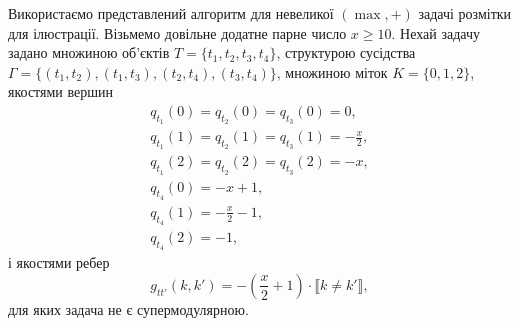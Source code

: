 Використаємо представлений алгоритм для невеликої $(\max,+)$ задачі розмітки для ілюстрації.
Візьмемо довільне додатне парне число $x\geq 10$. Нехай задачу задано множиною
об'єктів $T=\{t_1,t_2,t_3,t_4\}$, структурою сусідства \\$\Gamma=\{(t_1,t_2),(t_1,t_3),(t_2,t_4),(t_3,t_4)\}$, 
множиною міток $K=\{0,1,2\}$, якостями вершин 
\begin{equation}
    \begin{aligned}
       q_{t_1}(0)=q_{t_2}(0)=q_{t_3}(0)=0,\\
       q_{t_1}(1)=q_{t_2}(1)=q_{t_3}(1)=-\frac{x}{2},\\
       q_{t_1}(2)=q_{t_2}(2)=q_{t_3}(2)=-x,\\
       q_{t_4}(0)=-x+1,\\
       q_{t_4}(1)=-\frac{x}{2}-1,\\
       q_{t_4}(2)=-1,
    \end{aligned}
\end{equation}
і якостями ребер 
\begin{equation}
    g_{tt'}(k,k')=-\left(\frac{x}{2}+1\right)\cdot\llbracket k\neq k'\rrbracket,
\end{equation}
для яких задача не є супермодулярною.

